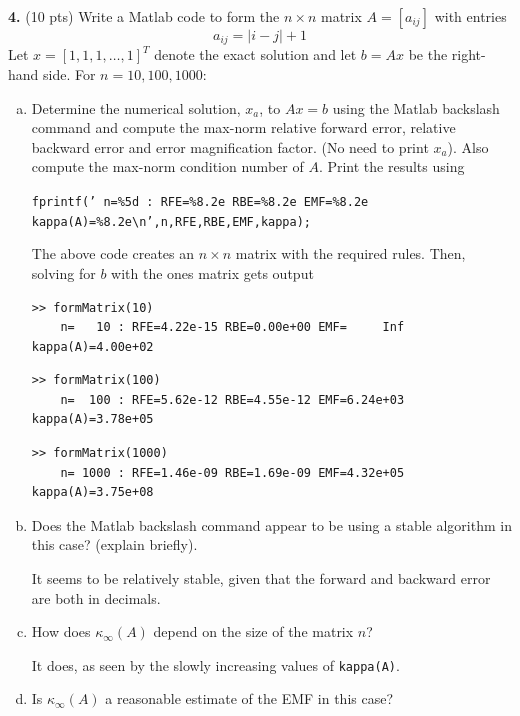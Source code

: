 \documentclass[10pt,letterpaper]{article}
\begin{document}
\noindent\textbf{4. }(10 pts) Write a Matlab code to form the $n \times n$ matrix $A = [a_{ij}]$ with entries
$$a_{ij} = |i - j| + 1$$
Let $x = [1, 1, 1, \dots, 1]^{T}$ denote the exact solution and let $b = Ax$ be the right-hand side. For $n = 10, 100, 1000$: 

\begin{enumerate}[(a)]

\item Determine the numerical solution, $x_{a}$, to $Ax = b$ using the Matlab backslash command and compute the max-norm relative forward error, relative backward error and error magnification factor. (No need to print $x_{a}$). Also compute the max-norm condition number of $A$. Print the results using

{\tt fprintf(’ n=\%5d : RFE=\%8.2e RBE=\%8.2e EMF=\%8.2e kappa(A)=\%8.2e\textbackslash n’,n,RFE,RBE,EMF,kappa);}

\color{TangGreen}

The above code creates an $n \times n$ matrix with the required rules. Then, solving for $b$ with the ones matrix gets output
\begin{lstlisting}
>> formMatrix(10)
	n=   10 : RFE=4.22e-15 RBE=0.00e+00 EMF=     Inf kappa(A)=4.00e+02
\end{lstlisting}
\begin{lstlisting}
>> formMatrix(100)
	n=  100 : RFE=5.62e-12 RBE=4.55e-12 EMF=6.24e+03 kappa(A)=3.78e+05
\end{lstlisting}
\begin{lstlisting}
>> formMatrix(1000)
	n= 1000 : RFE=1.46e-09 RBE=1.69e-09 EMF=4.32e+05 kappa(A)=3.75e+08
\end{lstlisting}
\color{black}

\item Does the Matlab backslash command appear to be using a stable algorithm in this case? (explain briefly).

\color{TangGreen}
It seems to be relatively stable, given that the forward and backward error are both in decimals.  
\color{black}

\item How does $\kappa_{\infty}(A)$ depend on the size of the matrix $n$?

\color{TangGreen}
It does, as seen by the slowly increasing values of {\tt kappa(A)}. 
\color{black}

\item Is $\kappa_{\infty}(A)$ a reasonable estimate of the EMF in this case?


\end{enumerate}
\end{document}
